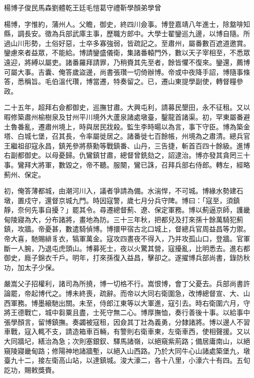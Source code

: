
\begin{pinyinscope}
楊博子俊民馬森劉體乾王廷毛愷葛守禮靳學顏弟學曾

楊博，字惟約，蒲州人。父瞻，御史，終四川僉事。博登嘉靖八年進士，除盩啡知縣，調長安。徵為兵部武庫主事，歷職方郎中。大學士翟鑾巡九邊，以博自隨。所過山川形勢，土俗好惡，士卒多寡強弱，皆疏記之。至肅州，屬番數百遮道邀賞。鑾慮來者益眾，不能給。博請鑾盛儀衛，集諸番轅門外，數以天子宰相至，不悉眾遠迎，將縛以屬吏。諸番羅拜請罪，乃稍賚其先至者，餘皆懼不復來。鑾還，薦博可屬大事。吉囊、俺答歲盜邊，尚書張瓚一切倚辦博。帝或中夜降手詔，博隨事條答，悉稱旨。毛伯溫代瓚，博當遷，特奏留之。已，遷山東提學副使，轉督糧參政。

二十五年，超拜右僉都御史，巡撫甘肅。大興屯利，請募民墾田，永不征租。又以暇修築肅州榆樹泉及甘州平川境外大蘆泉諸處墩臺，鑿龍首諸渠。初，罕東屬番避土魯番亂，遷肅州境上，時與居民戕殺。監生李時暘以為言，事下守臣。博為築金塔、白城七堡，召其長，令率屬徙居之。諸番徙七百餘帳，州境為之肅清。總兵官王繼祖卻寇永昌，鎮羌參將蔡勳等戰鎮番、山丹，三告捷，斬首百四十餘級。進博右副都御史。以母憂歸。仇鸞鎮甘肅，總督曾銑劾之，詔逮治。博亦發其貪罔三十事。鸞拜大將軍，數毀之，帝不聽。服闋，鸞已誅，召拜兵部右侍郎。轉左，經略薊州、保定。

初，俺答薄都城，由潮河川入，議者爭請為備。水湍悍，不可城。博緣水勢建石墩，置戍守，還督京城九門。時因寇警，歲七月分兵守陴。博曰：「寇至，須鎮靜，奈何先事自擾？」罷其令。尋遷總督薊、遼、保定軍務。博以薊逼京師，護畿甸陵寢為大，分布諸將，畫地為防。三十三年秋，把都兒及打來孫十餘萬騎犯薊鎮，攻牆。帝憂甚，數遣騎偵博。博擐甲宿古北口城上，督總兵官周益昌等力禦。帝大喜，馳賜緋豸衣，犒軍萬金。寇攻四晝夜不得入，乃并攻孤山口，登牆。官軍斷一人腕，乃退屯虎頭山。博募死士，夜以火驚其營，寇擾亂，比明悉去。進右都御史，廕子錦衣千戶。明年，打來孫復入益昌，擊卻之。遂擢博兵部尚書，錄防秋功，加太子少保。

嚴嵩父子招權利，諸司為所撓，博一切格不行。嵩恨博，會丁父憂去。兵部尚書許論罷，帝起博代之。博未終喪，疏辭。而帝以大同右衛圍急，改博總督宣、大、山西軍務。博墨縗馳出關。未至，侍郎江東等以大軍進，寇引去。時右衛圍六月，守將王德戰亡，城中芻粟且盡，士死守無二心。博厚撫恤，奏行善後十事。以給事中張學顏言，留博鎮撫。奏蠲被寇租，因僉其丁壯為義勇，分隸諸將。博以邊人不習車戰，寇入輒不支，請造箱車百輛，有警則右衛車東，左衛車西，使相聲援。又以大同牆圮，繕治為急；次則塞銀釵、驛馬諸嶺，以絕窺紫荊路；備居庸南山，以絕窺陵寢畿甸路；修陽神地諸牆塹，以絕入山西路。乃於大同牛心山諸處築堡九，墩臺九十二，接左衛高山站，以達鎮城。浚大濠二，各十八里，小濠六十有四。五旬訖功，賜敕獎賚。


\end{pinyinscope}
